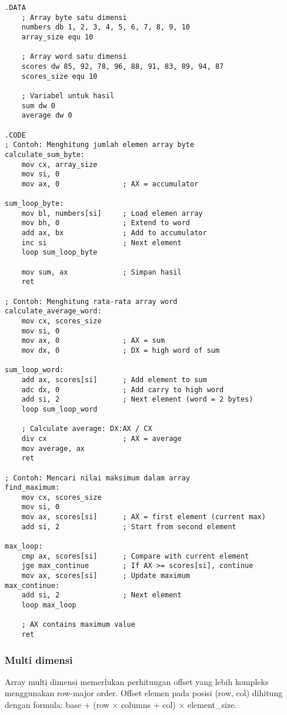 \documentclass[../main.tex]{subfiles}
\begin{document}
                \begin{lstlisting}[language={[x86masm]Assembler}, caption=Operasi Array Satu Dimensi, label={lst:one-dim-array}]
.DATA
    ; Array byte satu dimensi
    numbers db 1, 2, 3, 4, 5, 6, 7, 8, 9, 10
    array_size equ 10
    
    ; Array word satu dimensi
    scores dw 85, 92, 78, 96, 88, 91, 83, 89, 94, 87
    scores_size equ 10
    
    ; Variabel untuk hasil
    sum dw 0
    average dw 0

.CODE
; Contoh: Menghitung jumlah elemen array byte
calculate_sum_byte:
    mov cx, array_size
    mov si, 0
    mov ax, 0               ; AX = accumulator
    
sum_loop_byte:
    mov bl, numbers[si]     ; Load elemen array
    mov bh, 0               ; Extend to word
    add ax, bx              ; Add to accumulator
    inc si                  ; Next element
    loop sum_loop_byte
    
    mov sum, ax             ; Simpan hasil
    ret

; Contoh: Menghitung rata-rata array word
calculate_average_word:
    mov cx, scores_size
    mov si, 0
    mov ax, 0               ; AX = sum
    mov dx, 0               ; DX = high word of sum
    
sum_loop_word:
    add ax, scores[si]      ; Add element to sum
    adc dx, 0               ; Add carry to high word
    add si, 2               ; Next element (word = 2 bytes)
    loop sum_loop_word
    
    ; Calculate average: DX:AX / CX
    div cx                  ; AX = average
    mov average, ax
    ret

; Contoh: Mencari nilai maksimum dalam array
find_maximum:
    mov cx, scores_size
    mov si, 0
    mov ax, scores[si]      ; AX = first element (current max)
    add si, 2               ; Start from second element
    
max_loop:
    cmp ax, scores[si]      ; Compare with current element
    jge max_continue        ; If AX >= scores[si], continue
    mov ax, scores[si]      ; Update maximum
max_continue:
    add si, 2               ; Next element
    loop max_loop
    
    ; AX contains maximum value
    ret
                \end{lstlisting}

            \subsubsection{Multi dimensi}
                Array multi dimensi memerlukan perhitungan offset yang lebih kompleks menggunakan row-major order. Offset elemen pada posisi (row, col) dihitung dengan formula: base + (row $\times$ columns + col) $\times$ element\_size.
\end{document}
